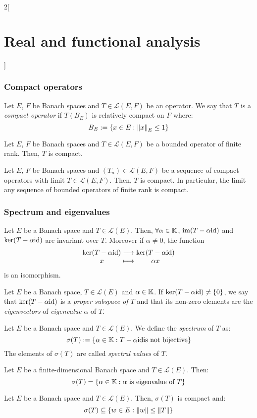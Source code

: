 \documentclass[../../../main_math.tex]{subfiles}
\begin{document}
\begin{multicols}{2}[\section{Real and functional analysis}]
  \subsubsection{Compact operators}
  \begin{definition}
    Let $E$, $F$ be Banach spaces and $T\in\mathcal{L}(E,F)$ be an operator. We say that $T$ is a \emph{compact operator} if $T(B_E)$ is relatively compact on $F$ where: $$B_E:=\{x\in E:\left\|x\right\|_E\leq 1\}$$
  \end{definition}
  \begin{lemma}
    Let $E$, $F$ be Banach spaces and $T\in\mathcal{L}(E,F)$ be a bounded operator of finite rank. Then, $T$ is compact.
  \end{lemma}
  \begin{proposition}
    Let $E$, $F$ be Banach spaces and $(T_n)\in\mathcal{L}(E,F)$ be a sequence of compact operators with limit $T\in\mathcal{L}(E,F)$. Then, $T$ is compact. In particular, the limit any sequence of bounded operators of finite rank is compact.
  \end{proposition}
  \subsubsection{Spectrum and eigenvalues}
  \begin{proposition}
    Let $E$ be a Banach space and $T\in\mathcal{L}(E)$. Then, $\forall \alpha\in\mathbb{K}$, $\operatorname{im}(T-\alpha\mathrm{id})$ and $\ker(T-\alpha\mathrm{id})$ are invariant over $T$. Moreover if $\alpha\ne 0$, the function $$\function{}{\ker(T-\alpha\id)}{\ker(T-\alpha\id)}{x}{\alpha x}$$ is an isomorphism.
  \end{proposition}
  \begin{definition}
    Let $E$ be a Banach space, $T\in\mathcal{L}(E)$ and $\alpha\in \mathbb{K}$. If $\ker(T-\alpha\mathrm{id})\ne\{0\}$, we say that $\ker(T-\alpha\mathrm{id})$ is a \emph{proper subspace of $T$} and that its non-zero elements are the \emph{eigenvectors} of \emph{eigenvalue} $\alpha$ of $T$.
  \end{definition}
  \begin{definition}
    Let $E$ be a Banach space and $T\in\mathcal{L}(E)$. We define the \emph{spectrum} of $T$ as: $$\sigma(T):=\{\alpha\in\mathbb{K}:T-\alpha\mathrm{id}\text{is not bijective}\}$$
    The elements of $\sigma(T)$ are called \emph{spectral values} of $T$.
  \end{definition}
  \begin{proposition}
    Let $E$ be a finite-dimensional Banach space and $T\in\mathcal{L}(E)$. Then: $$\sigma(T)=\{\alpha\in\mathbb{K}:\alpha\text{ is eigenvalue of }T\}$$
  \end{proposition}
  \begin{proposition}
    Let $E$ be a Banach space and $T\in\mathcal{L}(E)$. Then, $\sigma(T)$ is compact and: $$\sigma(T)\subseteq\{w\in E:\left\|w\right\|\leq\left\|T\right\|\}$$
  \end{proposition}

\end{multicols}
\end{document}
